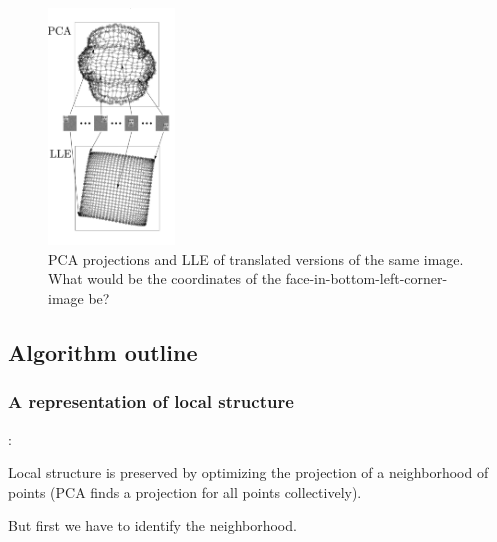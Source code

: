 \begin{frame}

\svspace{-5mm}
 
\begin{figure}[ht]
	\centering
    \includegraphics[width=0.3\textwidth]{img/fig3_lle_intro_cropped.png}
	\caption{PCA projections and LLE of translated versions of the same image. What would be the coordinates of the face-in-bottom-left-corner-image be? \cite{Saul2001AnIT}}
	\label{fig:faces_translated_pca_lle}
\end{figure}
\end{frame}

\subsection{Algorithm outline}

\subsubsection{A representation of local structure}

\begin{frame}{\subsecname:~\subsubsecname}

Local structure is preserved by optimizing the projection of a neighborhood of points (PCA finds a projection for all points collectively).

\pause

But first we have to identify the neighborhood.

\end{frame}

